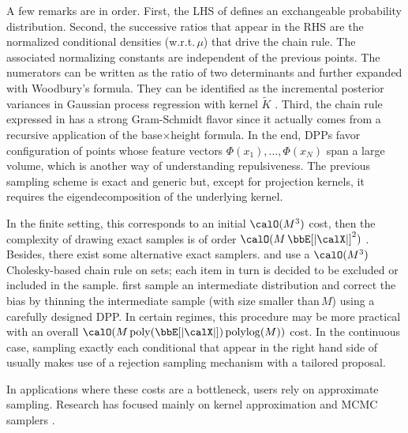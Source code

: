 \documentclass[twoside,11pt]{article}
\begin{document}
        A few remarks are in order.
        First, the LHS of  defines an exchangeable probability distribution.
        Second, the successive ratios that appear in the RHS are the normalized conditional densities (w.r.t.\,$\mu$) that drive the chain rule.
        The associated normalizing constants are independent of the previous points.
        The numerators can be written as the ratio of two determinants and further expanded with Woodbury's formula.
        They can be identified as the incremental posterior variances in Gaussian process regression with kernel $\tilde{K}$ \citep[Equation 2.26]{RaWi06}.
        Third, the chain rule expressed in  has a strong Gram-Schmidt flavor since it actually comes from a recursive application of the base$\times$height formula.
        In the end, DPPs favor configuration of points whose feature vectors $\Phi(x_1),\dots, \Phi(x_N)$ span a large volume, which is another way of understanding repulsiveness.
        The previous sampling scheme is exact and generic but, except for projection kernels, it requires the eigendecomposition of the underlying kernel.

        In the finite setting, this corresponds to an initial $\calO(M^3)$ cost, then the complexity of drawing exact samples is of order $\calO(M\Expe{|\calX|}^2)$
        \citep[see, e.g.,][]{Gil14,TrBaAm18}.
        Besides, there exist some alternative exact samplers.
        \citet{Pou19} and  use a $\calO(M^3)$ Cholesky-based chain rule on sets; each item in turn is decided to be excluded or included in the sample.
         first sample an intermediate distribution and correct the bias by thinning the intermediate sample (with size smaller than\,$M$) using a carefully designed DPP.
        In certain regimes, this procedure may be more practical with an overall
        $\calO(M\operatorname{poly}(\Expe{|\calX|})\operatorname{polylog}(M))$ cost.
        In the continuous case, sampling exactly each conditional that appear in the right hand side of  usually makes use of a rejection sampling mechanism with a tailored proposal.

        In applications where these costs are a bottleneck, users rely on approximate sampling.
        Research has focused mainly on kernel approximation \citep{AKFT13} and MCMC samplers \citep{AnGhRe16, LiJeSr16c, GaBaVa17}.
\end{document}
